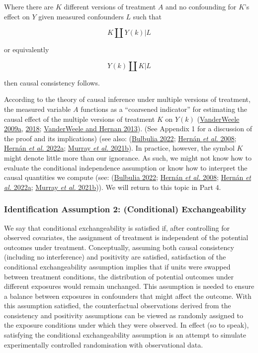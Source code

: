 \documentclass[
  singlecolumn]{article}
\begin{document}
Where there are \(K\) different versions of treatment \(A\) and no
confounding for \(K\)'s effect on \(Y\) given measured confounders \(L\)
such that

\[
K \coprod Y(k) | L
\]

or equivalently

\[
Y(k) \coprod K | L
\]

then causal consistency follows.

According to the theory of causal inference under multiple versions of
treatment, the measured variable \(A\) functions as a ``coarsened
indicator'' for estimating the causal effect of the multiple versions of
treatment \(K\) on \(Y(k)\)
(\protect\hyperlink{ref-vanderweele2009}{VanderWeele 2009a},
\protect\hyperlink{ref-vanderweele2018}{2018};
\protect\hyperlink{ref-vanderweele2013}{VanderWeele and Hernan 2013}).
(See Appendix 1 for a discussion of the proof and its implications) (see
also: (\protect\hyperlink{ref-bulbulia2022}{Bulbulia 2022};
\protect\hyperlink{ref-hernuxe1n2008}{Hernán \emph{et al.} 2008};
\protect\hyperlink{ref-hernuxe1n2022a}{Hernán \emph{et al.} 2022a};
\protect\hyperlink{ref-murray2021a}{Murray \emph{et al.} 2021b}). In
practice, however, the symbol \(K\) m️ight denote little more than our
ignorance. As such, we might not know how to evaluate the conditional
independence assumption or know how to interpret the causal quantities
we compute (see: (\protect\hyperlink{ref-bulbulia2022}{Bulbulia 2022};
\protect\hyperlink{ref-hernuxe1n2008}{Hernán \emph{et al.} 2008};
\protect\hyperlink{ref-hernuxe1n2022a}{Hernán \emph{et al.} 2022a};
\protect\hyperlink{ref-murray2021a}{Murray \emph{et al.} 2021b})). We
will return to this topic in Part 4.

\hypertarget{identification-assumption-2-conditional-exchangeability}{%
\subsubsection{Identification Assumption 2: (Conditional)
Exchangeability}\label{identification-assumption-2-conditional-exchangeability}}

We say that conditional exchangeability is satisfied if, after
controlling for observed covariates, the assignment of treatment is
independent of the potential outcomes under treatment. Conceptually,
assuming both causal consistency (including no interference) and
positivity are satisfied, satisfaction of the conditional
exchangeability assumption implies that if units were swapped between
treatment conditions, the distribution of potential outcomes under
different exposures would remain unchanged. This assumption is needed to
ensure a balance between exposures in confounders that might affect the
outcome. With this assumption satisfied, the counterfactual observations
derived from the consistency and positivity assumptions can be viewed as
randomly assigned to the exposure conditions under which they were
observed. In effect (so to speak), satisfying the conditional
exchangeability assumption is an attempt to simulate experimentally
controlled randomisation with observational data.
\end{document}
